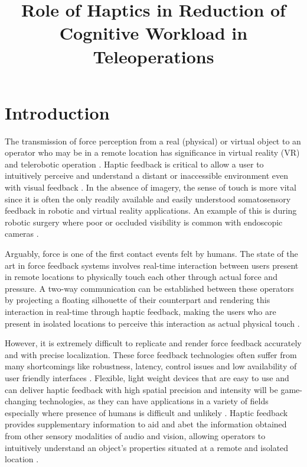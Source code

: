 \documentclass[]{article}
\title{Role of Haptics in Reduction of Cognitive Workload in Teleoperations}
\begin{document}
\maketitle


\section{Introduction}


  The transmission of force perception from a real (physical) or virtual object to an operator who may be in a remote location has signiﬁcance in virtual reality (VR) and telerobotic operation \cite{galambos2012vibrotactile}. Haptic feedback is critical to allow a user to intuitively perceive and understand a distant or inaccessible environment even with visual feedback \cite{bark2013vivo}. In the absence of imagery, the sense of touch is more vital since it is often the only readily available and easily understood somatosensory feedback in robotic and virtual reality applications. An example of this is during robotic surgery where poor or occluded visibility is common with endoscopic cameras \cite{bouzit2002rutgers}.
  
  
  Arguably, force is one of the ﬁrst contact events felt by humans.  The state of the art in force feedback systems involves real-time interaction between users present in remote locations to physically touch each other through actual force and pressure. A two-way communication can be established between these operators by projecting a floating silhouette of their counterpart and rendering this interaction in real-time through haptic feedback, making the users who are present in isolated locations to perceive this interaction as actual physical touch \cite{makino2016haptoclone}.


  However, it is extremely difficult to replicate and render force feedback accurately and with precise localization. These force feedback technologies often suffer from many shortcomings like robustness, latency, control issues and low availability of user friendly interfaces \cite{galambos2012vibrotactile} \cite{wagner2005mechanisms}. Flexible, light weight devices that are easy to use and can deliver haptic feedback with high spatial precision and intensity will be game- changing technologies, as they can have applications in a variety of fields especially where presence of humans is difficult and unlikely \cite{wagner2005mechanisms} \cite{nagendran2015symmetric}. Haptic feedback provides supplementary information to aid and abet the information obtained from other sensory modalities of audio and vision, allowing operators to intuitively understand an object’s properties situated at a remote and isolated location \cite{bark2013vivo}. 
\end{document}
